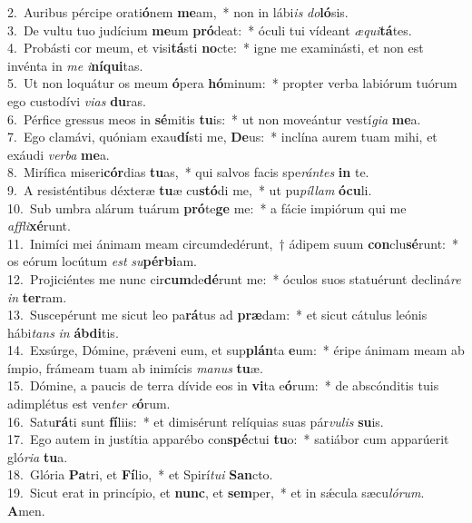 {2.~}Auribus pércipe orati\textbf{ó}nem \textbf{me}am,~* non in lábi\textit{is} \textit{do}\textbf{ló}sis.\\
{3.~}De vultu tuo judícium \textbf{me}um \textbf{pró}deat:~* óculi tui vídeant \textit{æ}\textit{qui}\textbf{tá}tes.\\
{4.~}Probásti cor meum, et visi\textbf{tá}sti \textbf{no}cte:~* igne me examinásti, et non est invénta in \textit{me} \textit{i}\textbf{ní}\textbf{qui}tas.\\
{5.~}Ut non loquátur os meum \textbf{ó}pera \textbf{hó}minum:~* propter verba labiórum tuórum ego custodívi \textit{vi}\textit{as} \textbf{du}ras.\\
{6.~}Pérfice gressus meos in \textbf{sé}mitis \textbf{tu}is:~* ut non moveántur vestí\textit{gi}\textit{a} \textbf{me}a.\\
{7.~}Ego clamávi, quóniam exau\textbf{dí}sti me, \textbf{De}us:~* inclína aurem tuam mihi, et exáudi \textit{ver}\textit{ba} \textbf{me}a.\\
{8.~}Mirífica miseri\textbf{cór}dias \textbf{tu}as,~* qui salvos facis spe\textit{rán}\textit{tes} \textbf{in} te.\\
{9.~}A resisténtibus déxteræ \textbf{tu}æ cu\textbf{stó}di me,~* ut pu\textit{píl}\textit{lam} \textbf{ó}\textbf{cu}li.\\
{10.~}Sub umbra alárum tuárum \textbf{pró}te\textbf{ge} me:~* a fácie impiórum qui me \textit{af}\textit{fli}\textbf{xé}runt.\\
{11.~}Inimíci mei ánimam meam circumdedérunt,~† ádipem suum \textbf{con}clu\textbf{sé}runt:~* os eórum locútum \textit{est} \textit{su}\textbf{pér}\textbf{bi}am.\\
{12.~}Projiciéntes me nunc cir\textbf{cum}de\textbf{dé}runt me:~* óculos suos statuérunt decliná\textit{re} \textit{in} \textbf{ter}ram.\\
{13.~}Suscepérunt me sicut leo pa\textbf{rá}tus ad \textbf{præ}dam:~* et sicut cátulus leónis hábi\textit{tans} \textit{in} \textbf{áb}\textbf{di}tis.\\
{14.~}Exsúrge, Dómine, prǽveni eum, et sup\textbf{plán}ta \textbf{e}um:~* éripe ánimam meam ab ímpio, frámeam tuam ab inimícis \textit{ma}\textit{nus} \textbf{tu}æ.\\
{15.~}Dómine, a paucis de terra dívide eos in \textbf{vi}ta e\textbf{ó}rum:~* de abscónditis tuis adimplétus est ven\textit{ter} \textit{e}\textbf{ó}rum.\\
{16.~}Satu\textbf{rá}ti sunt \textbf{fí}liis:~* et dimisérunt relíquias suas pár\textit{vu}\textit{lis} \textbf{su}is.\\
{17.~}Ego autem in justítia apparébo con\textbf{spé}ctui \textbf{tu}o:~* satiábor cum apparúerit gló\textit{ri}\textit{a} \textbf{tu}a.\\
{18.~}Glória \textbf{Pa}tri, et \textbf{Fí}lio,~* et Spirí\textit{tu}\textit{i} \textbf{San}cto.\\
{19.~}Sicut erat in princípio, et \textbf{nunc}, et \textbf{sem}per,~* et in sǽcula sæcu\textit{ló}\textit{rum}. \textbf{A}men.\\
